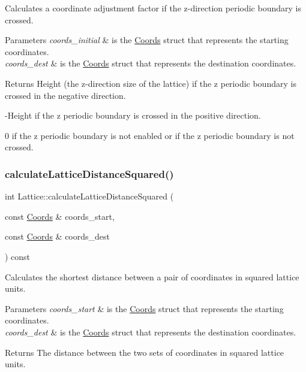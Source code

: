 Calculates a coordinate adjustment factor if the z-\/direction periodic boundary is crossed. 


\begin{DoxyParams}{Parameters}
{\em coords\+\_\+initial} & is the \hyperlink{struct_coords}{Coords} struct that represents the starting coordinates. \\
\hline
{\em coords\+\_\+dest} & is the \hyperlink{struct_coords}{Coords} struct that represents the destination coordinates. \\
\hline
\end{DoxyParams}
\begin{DoxyReturn}{Returns}
Height (the z-\/direction size of the lattice) if the z periodic boundary is crossed in the negative direction. 

-\/\+Height if the z periodic boundary is crossed in the positive direction. 

0 if the z periodic boundary is not enabled or if the z periodic boundary is not crossed. 
\end{DoxyReturn}
\mbox{\label{class_lattice_a3f51b0b41cf0e43e0469320310494a1e}} 
\subsubsection{\texorpdfstring{calculate\+Lattice\+Distance\+Squared()}{calculateLatticeDistanceSquared()}}
{\footnotesize\ttfamily int Lattice\+::calculate\+Lattice\+Distance\+Squared (\begin{DoxyParamCaption}\item[{const \hyperlink{struct_coords}{Coords} \&}]{coords\+\_\+start,  }\item[{const \hyperlink{struct_coords}{Coords} \&}]{coords\+\_\+dest }\end{DoxyParamCaption}) const}



Calculates the shortest distance between a pair of coordinates in squared lattice units. 


\begin{DoxyParams}{Parameters}
{\em coords\+\_\+start} & is the \hyperlink{struct_coords}{Coords} struct that represents the starting coordinates. \\
\hline
{\em coords\+\_\+dest} & is the \hyperlink{struct_coords}{Coords} struct that represents the destination coordinates. \\
\hline
\end{DoxyParams}
\begin{DoxyReturn}{Returns}
The distance between the two sets of coordinates in squared lattice units. 
\end{DoxyReturn}
\mbox{\label{class_lattice_ad0592298c4b92e9e84a768b95cd6d0f0}} 
